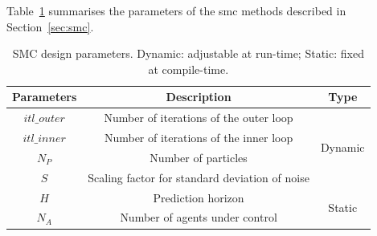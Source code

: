 Table~\ref{tab:parameters} summarises the parameters of the \gls{smc} methods described in Section~\ref{sec:smc}.

\begin{table}
	\setlength{\tabcolsep}{3pt}
	\begin{spacing}{1.0}
	\caption{SMC design parameters. Dynamic: adjustable at run-time; Static: fixed at compile-time.}
	\label{tab:parameters}
	\footnotesize
	\centering
	\smallskip
		\begin{tabular}{c|c|c}
			\hline
			 Parameters & Description & Type\\
			\hline
			\hline
			$itl\_outer$ & Number of iterations of the outer loop & \multirow{4}{*}{Dynamic}\\
			$itl\_inner$ & Number of iterations of the inner loop &\\
			$N_P$ & Number of particles &\\
			$S$ & Scaling factor for standard deviation of noise &\\
			\hline
			$H$ & Prediction horizon & \multirow{2}{*}{Static}\\
			$N_A$ & Number of agents under control &\\
			\hline
		\end{tabular}
		\end{spacing}
\end{table}



